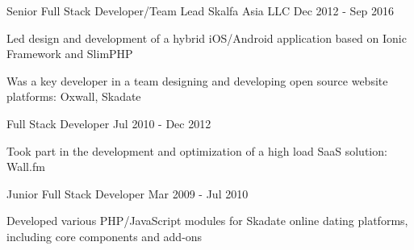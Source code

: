 \begin{cventries}

  \cventry
    {Senior Full Stack Developer/Team Lead} %
    {Skalfa Asia LLC} %
    {} %
    {Dec 2012 - Sep 2016} %
    {
      \begin{cvitems}
        \item Led design and development of a hybrid iOS/Android application based on Ionic Framework and SlimPHP
        \item Was a key developer in a team designing and developing open source website platforms: Oxwall, Skadate
      \end{cvitems}
    }

  \cventry
    {Full Stack Developer} %
    {} %
    {} %
    {Jul 2010 - Dec 2012} %
    {
      \begin{cvitems}
        \item Took part in the development and optimization of a high load SaaS solution: Wall.fm
      \end{cvitems}
    }

  \cventry
    {Junior Full Stack Developer} %
    {} %
    {} %
    {Mar 2009 - Jul 2010} %
    {
      \begin{cvitems}
        \item Developed various PHP/JavaScript modules for Skadate online dating platforms, including core components and add-ons
      \end{cvitems}
    }

\end{cventries}
